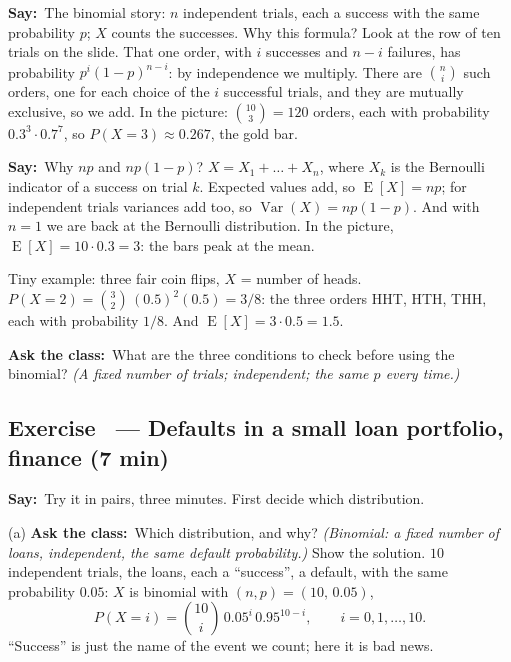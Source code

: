 \documentclass[11pt,a4paper,parskip=half]{scrartcl}
\newcommand{\E}{\operatorname{E}}
\newcommand{\Var}{\operatorname{Var}}
\newcommand{\say}{\textbf{\color{teal}Say:}\ }
\newcommand{\ask}{\textbf{\color{navy}Ask the class:}\ }
\begin{document}
\say The binomial story: $n$ independent trials, each a success with the
same probability $p$; $X$ counts the successes. Why this formula? Look at
the row of ten trials on the slide. That one order, with $i$ successes and
$n-i$ failures, has probability $p^i(1-p)^{n-i}$: by independence we
multiply. There are $\binom{n}{i}$ such orders, one for each choice of the
$i$ successful trials, and they are mutually exclusive, so we add. In the
picture: $\binom{10}{3}=120$ orders, each with probability
$0.3^3\cdot0.7^7$, so $P(X=3)\approx0.267$, the gold bar.

\say Why $np$ and $np(1-p)$? $X=X_1+\dots+X_n$, where $X_k$ is the
Bernoulli indicator of a success on trial $k$. Expected values add, so
$\E[X]=np$; for independent trials variances add too, so
$\Var(X)=np(1-p)$. And with $n=1$ we are back at the Bernoulli
distribution. In the picture, $\E[X]=10\cdot0.3=3$: the bars peak at the
mean.

Tiny example: three fair coin flips, $X$ = number of heads. $P(X=2)=
\binom32\,(0.5)^2(0.5)=3/8$: the three orders HHT, HTH, THH, each with
probability $1/8$. And $\E[X]=3\cdot0.5=1.5$.

\ask What are the three conditions to check before using the binomial?
\emph{(A fixed number of trials; independent; the same $p$ every time.)}

\needspace{0.25\textheight}
\subsection{Exercise~ --- Defaults in a small loan portfolio, finance (7 min)}


\say Try it in pairs, three minutes. First decide which distribution.

(a) \ask Which distribution, and why? \emph{(Binomial: a fixed number of
loans, independent, the same default probability.)} Show the solution.
$10$ independent trials, the loans, each a ``success'', a default, with
the same probability $0.05$: $X$ is binomial with $(n,p)=(10,\,0.05)$,
\[ P(X=i)=\binom{10}{i}\,0.05^i\,0.95^{10-i},\qquad i=0,1,\dots,10. \]
``Success'' is just the name of the event we count; here it is bad news.
\end{document}
